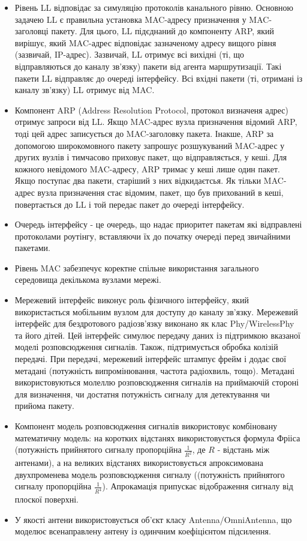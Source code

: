 \documentclass[a4paper,ukrainian,utf8,nocolumnsxix,floatsection,equationsection]{eskdtext}
\begin{document}
\begin{itemize}
	\item Рівень LL відповідає за симуляцію протоколів канального рівню. Основною задачею LL є правильна установка MAC-адресу призначення у MAC-заголовці пакету. Для цього, LL підєднаний до компоненту ARP, який вирішує, який MAC-адрес відповідає зазначеному адресу вищого рівня (зазвичай, IP-адрес). Зазвичай, LL отримує всі вихідні (ті, що відправляються до каналу зв’язку) пакети від агента маршрутизації. Такі пакети LL відправляє до очереді інтерфейсу. Всі вхідні пакети (ті, отримані із каналу зв’язку) LL отримує від MAC.

	\item Компонент ARP (Address Resolution Protocol, протокол визначеня адрес) отримує запроси від LL. Якщо MAC-адрес вузла призначення відомий ARP, тоді цей адрес записується до MAC-заголовку пакета. Інакше, ARP за допомогою широкомовного пакету запрошує розшукуваний MAC-адрес у других вузлів і тимчасово приховує пакет, що відправляється, у кеші. Для кожного невідомого MAC-адресу, ARP тримає у кеші лише один пакет. Якщо поступає два пакети, старіший з них відкидаєтсья. Як тільки MAC-адрес вузла призначення стає відомим, пакет, що був прихований в кеші, повертається до LL і той передає пакет до очереді інтерфейсу.

	\item Очередь інтерфейсу - це очередь, що надає приоритет пакетам які відправлені протоколами роутінгу, вставляючи їх до початку очереді перед звичайними пакетами.

	\item Рівень MAC забезпечує коректне спільне використання загального середовища декількома вузлами мережі. 

	\item Мережевий інтерфейс виконує роль фізичного інтерфейсу, який використається мобільним вузлом для доступу до каналу зв’язку. Мережевий інтерфейс для бездротового радіозв’язку виконано як клас Phy/WirelessPhy та його дітей. Цей інтерфейс симулює передачу даних із підтримкою вказаної моделі розповсюдження сигналів. Також, підтримується обробка колізій передачі. При передачі, мережевий інтерфейс штампує фрейм і додає свої метадані (потужність випромінювання, частота радіохвиль, тощо). Метадані використовуються молеллю розповсюдження сигналів на приймаючій стороні для визначення, чи достатня потужність сигналу для детектування чи прийома пакету.

	\item Компонент модель розповсюдження сигналів використовує комбіновану математичну модель: на коротких відстанях використовується формула Фрііса (потужність прийнятого сигналу пропорційна $\frac{1}{R^2}$, де $R$ - відстань між антенами), а на великих відстанях використовується апроксимована двухпроменева модель розповсюдження сигналу ((потужність прийнятого сигналу пропорційна $\frac{1}{R^4}$). Апрокамація припускає відображення сигналу від плоскої поверхні. 

	\item У якості антени використовується об’єкт класу Antenna/OmniAntenna, що моделює всенаправлену антену із одинчним коефіцієнтом підсилення. 
\end{itemize}
\end{document}
